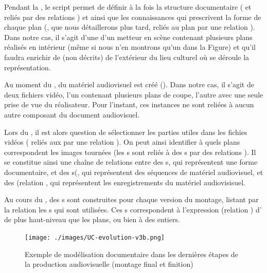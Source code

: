 \begin{liste}
	\item Pendant la , le script permet de définir à la fois la structure documentaire ( et  reliés par des relations ) et ainsi que les connaissances qui prescrivent la forme de chaque plan (, que nous détaillerons plus tard, reliés au plan par une relation ).
	Dans notre cas, il s'agit d'une  d'un metteur en scène contenant plusieurs plans réalisés en intérieur (même si nous n'en montrons qu'un dans la Figure) et qu'il faudra enrichir de  (non décrits) de l'extérieur du lieu culturel où se déroule la représentation.

	\item Au moment du , du matériel audiovisuel est créé (). 
	Dans notre cas, il s'agit de deux fichiers vidéo, l'un contenant plusieurs plans de coupe, l'autre avec une seule prise de vue du réalisateur.
	Pour l'instant, ces instances ne sont reliées à aucun autre composant du document audiovisuel.

	\item Lors du , il est alors question de sélectionner les parties utiles dans les fichies vidéos ( reliés aux  par une relation ).
	On peut ainsi identifier à quels plans correspondent les images tournées (les s sont reliés à des s par des relations ).
	Il se constitue ainsi une chaîne de relations entre des s, qui représentent une forme documentaire, et des s(, qui représentent des séquences de matériel audiovisuel, et des  (relation , qui représentent les enregistrements du matériel audiovisisuel.

	\item Au cours du , des s sont construites pour chaque version du montage, listant par la relation  les s qui sont utilisées. 
	Ces s correspondent à l'expression (relation ) d' de plus haut-niveau que les plans, ou bien à des  entiers.
\end{liste}

\begin{figure}[htb!]
\centering
\texttt{[image: ./images/UC-evolution-v3b.png]}
\caption{Exemple de modélisation documentaire dans les dernières étapes de la production audiovisuelle (montage final et finition)}
\label{img:uc-evo2}
\end{figure}

